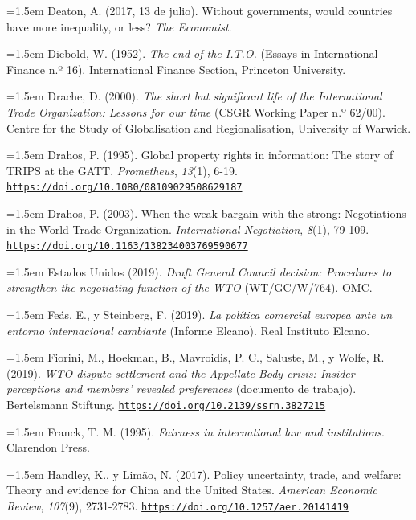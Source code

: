 \documentclass[10pt,a4paper]{article}
\begin{document}
\noindent\hangindent=1.5em Deaton, A. (2017, 13 de julio). Without governments, would countries have more inequality, or less? \textit{The Economist}.

\noindent\hangindent=1.5em Diebold, W. (1952). \textit{The end of the I.T.O.} (Essays in International Finance n.º 16). International Finance Section, Princeton University.

\noindent\hangindent=1.5em Drache, D. (2000). \textit{The short but significant life of the International Trade Organization: Lessons for our time} (CSGR Working Paper n.º 62/00). Centre for the Study of Globalisation and Regionalisation, University of Warwick.

\noindent\hangindent=1.5em Drahos, P. (1995). Global property rights in information: The story of TRIPS at the GATT. \textit{Prometheus}, \textit{13}(1), 6-19. \href{https://doi.org/10.1080/08109029508629187}{\nolinkurl{https://doi.org/10.1080/08109029508629187}}

\noindent\hangindent=1.5em Drahos, P. (2003). When the weak bargain with the strong: Negotiations in the World Trade Organization. \textit{International Negotiation}, \textit{8}(1), 79-109. \href{https://doi.org/10.1163/138234003769590677}{\nolinkurl{https://doi.org/10.1163/138234003769590677}}

\noindent\hangindent=1.5em Estados Unidos (2019). \textit{Draft General Council decision: Procedures to strengthen the negotiating function of the WTO} (WT/GC/W/764). OMC.

\noindent\hangindent=1.5em Feás, E., y Steinberg, F. (2019). \textit{La política comercial europea ante un entorno internacional cambiante} (Informe Elcano). Real Instituto Elcano.

\noindent\hangindent=1.5em Fiorini, M., Hoekman, B., Mavroidis, P. C., Saluste, M., y Wolfe, R. (2019). \textit{WTO dispute settlement and the Appellate Body crisis: Insider perceptions and members' revealed preferences} (documento de trabajo). Bertelsmann Stiftung. \href{https://doi.org/10.2139/ssrn.3827215}{\nolinkurl{https://doi.org/10.2139/ssrn.3827215}}

\noindent\hangindent=1.5em Franck, T. M. (1995). \textit{Fairness in international law and institutions}. Clarendon Press.

\noindent\hangindent=1.5em Handley, K., y Limão, N. (2017). Policy uncertainty, trade, and welfare: Theory and evidence for China and the United States. \textit{American Economic Review}, \textit{107}(9), 2731-2783. \href{https://doi.org/10.1257/aer.20141419}{\nolinkurl{https://doi.org/10.1257/aer.20141419}}
\end{document}

